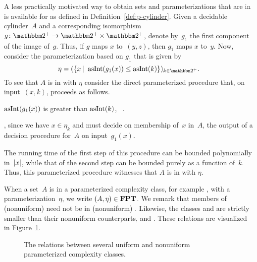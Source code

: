 \begin{example}
\label{ex:p-cylinder}%
  A less practically motivated way to obtain sets and parameterizations that are in  is available for  as defined in Definition~\ref{def:p-cylinder}.
  Given a decidable \pdash{}cylinder~$A$ and a corresponding isomorphism~$g\colon \binary^+ \to \binary^+ \times \binary^+$, denote by~$g_1$ the first component of the image of~$g$.
  Thus, if $g$ maps $x$ to~$(y, z)$, then $g_1$ maps $x$ to~$y$.
  Now, consider the parameterization based on $g_1$ that is given by
  \begin{equation*}
    \eta \deq (\{x \st \asNat(g_1(x)) \le \asNat(k)\})_{k \in \binary^+}.
  \end{equation*}
  To see that $A$ is in  with $\eta$ consider the direct parameterized procedure that, on input~$(x, k)$, proceeds as follows.
  \begin{codelisting}
  \item
     $\asNat(g_1(x))$ is greater than $\asNat(k)$, ~.
  \item
    , since we have $x \in \eta_k$ and must decide on membership of~$x$ in~$A$,
    \itemcont {} the output of a decision procedure for~$A$ on input~$g_1(x)$.
  \end{codelisting}
  The running time of the first step of this procedure can be bounded polynomially in~${\lvert x\rvert}$, while that of the second step can be bounded purely as a function of~$k$.
  Thus, this parameterized procedure witnesses that $A$ is in  with $\eta$.
\end{example}

When a set~$A$ is in a parameterized complexity class, for example , with a parameterization~$\eta$, we write $(A, \eta) \in \textnormal{\textbf{FPT}}$.
We remark that members of (nonuniform)  need not be in (nonuniform)  \parencite{downey1999parameterized,flum2006parameterized}.
Likewise, the classes  and  are strictly smaller than their nonuniform counterparts,  and  \parencite{downey1993fixed}.
These relations are visualized in Figure~\ref{fig:parameterized_classes}.
\begin{figure}
  \centering
  \caption{
    The relations between several uniform and nonuniform parameterized complexity classes.
  }
  \label{fig:parameterized_classes}
\end{figure}

